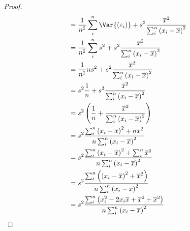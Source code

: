 \documentclass{article}
\begin{document}
\begin{proof}
\begin{align*}
                            & = \frac{1}{n^2} \sum_i^n\Var{\left( \varepsilon_i \right)} + s^2 \frac{\overline{x}^2}{\sum_i^n \left( x_i - \overline{x} \right)^2}                                                                                                               \\
                            & = \frac{1}{n^2} \sum_i^n s^2 + s^2 \frac{\overline{x}^2}{\sum_i^n \left( x_i - \overline{x} \right)^2}                                                                                                                                             \\
                            & = \frac{1}{n^2} n s^2 + s^2 \frac{\overline{x}^2}{\sum_i^n \left( x_i - \overline{x} \right)^2}                                                                                                                                                    \\
                            & = s^2 \frac{1}{n} + s^2 \frac{\overline{x}^2}{\sum_i^n \left( x_i - \overline{x} \right)^2}                                                                                                                                                        \\
                            & = s^2 \left( \frac{1}{n} + \frac{\overline{x}^2}{\sum_i^n \left( x_i - \overline{x} \right)^2} \right)                                                                                                                                             \\
                            & = s^2 \frac{\sum_i^n \left( x_i - \overline{x} \right)^2 + n\overline{x}^2}{n \sum_i^n \left( x_i - \overline{x} \right)^2}                                                                                                                        \\
                            & = s^2 \frac{\sum_i^n \left( x_i - \overline{x} \right)^2 + \sum_i^n \overline{x}^2}{n \sum_i^n \left( x_i - \overline{x} \right)^2}                                                                                                                \\
                            & = s^2 \frac{\sum_i^n \left( \left( x_i - \overline{x} \right)^2 + \overline{x}^2 \right)}{n \sum_i^n \left( x_i - \overline{x} \right)^2}                                                                                                          \\
                            & = s^2 \frac{\sum_i^n \left( x_i^2 - 2x_i\overline{x} + \overline{x}^2 + \overline{x}^2 \right)}{n \sum_i^n \left( x_i - \overline{x} \right)^2}                                                                                                    \\

\end{align*}
\end{proof}
\end{document}
